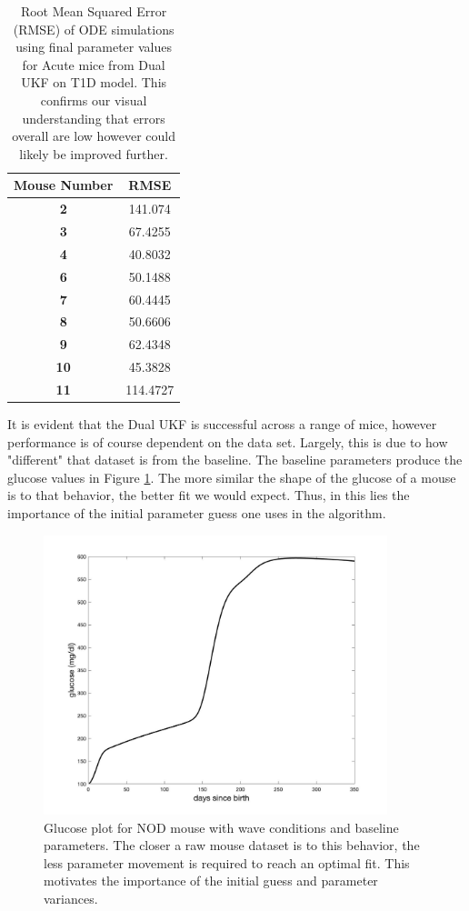 \begin{table}[H]
  \begin{center}
    \begin{tabular}{c|c} %
      \textbf{Mouse Number} & \textbf{RMSE} \\
      \hline
      \textbf{2} & 141.074\\
      \textbf{3} & 67.4255\\
      \textbf{4} & 40.8032\\
      \textbf{6} & 50.1488\\
      \textbf{7} & 60.4445\\
      \textbf{8} & 50.6606\\
      \textbf{9} & 62.4348\\
      \textbf{10} & 45.3828\\
      \textbf{11} & 114.4727
    \end{tabular}
    \caption{Root Mean Squared Error (RMSE) of ODE simulations using final parameter values for Acute mice from Dual UKF on T1D model. This confirms our visual understanding that errors overall are low however could likely be improved further.}
    \label{table:T1D_Dual_AllAcute_RMSE}
  \end{center}
\end{table}
It is evident that the Dual UKF is successful across a range of mice, however performance is of course dependent on the data set. Largely, this is due to how "different" that dataset is from the baseline. The baseline parameters produce the glucose values in Figure \ref{fig:T1D_BaselineGlucose}. The more similar the shape of the glucose of a mouse is to that behavior, the better fit we would expect. Thus, in this lies the importance of the initial parameter guess one uses in the algorithm.

\begin{figure}[H]
    \centering
    \includegraphics[width=10cm]{Kalman_Filter_Images/T1D_BaselineGlucose.jpg}
    \caption{Glucose plot for NOD mouse with wave conditions and baseline parameters. The closer a raw mouse dataset is to this behavior, the less parameter movement is required to reach an optimal fit. This motivates the importance of the initial guess and parameter variances.}
    \label{fig:T1D_BaselineGlucose}
\end{figure}



